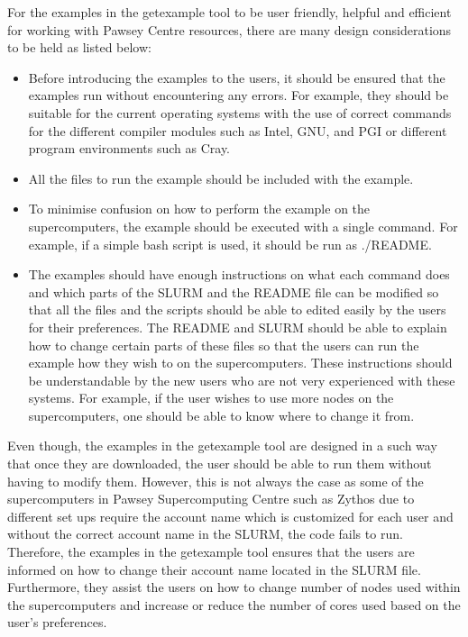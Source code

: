 For the examples in the getexample tool to be user friendly, helpful and efficient for working with Pawsey Centre resources, there are many design 
considerations to be held as listed below:

\begin{itemize}
\item Before introducing the examples to the users, it should be ensured that the examples run without encountering any errors. For example,
they should be suitable for the current operating systems with the use of correct commands for the different compiler modules such as Intel, GNU,
and PGI or different program environments such as Cray.
\item All the files to run the example should be included with the example.
\item To minimise confusion on how to perform the example on the supercomputers, the example should be executed with a single command. For example, 
if a simple bash script is used, it should be run as ./README.
\item The examples should have enough instructions on what each command does and which parts of the SLURM and the README file can be modified so that
all the files and the scripts should be able to edited easily by the users for their preferences. The README and SLURM should be able to explain how to 
change certain parts of these files so that the users can run the example how they wish to on the supercomputers. These instructions should be 
understandable by the new users who are not very experienced with these systems. For example, if the user wishes to use more nodes on the supercomputers,
one should be able to know where to change it from.
\end{itemize}
 
Even though, the examples in the getexample tool are designed in a such way that once they are downloaded, the user should be able to run them without
having to modify them. However, this is not always the case as some of the supercomputers in Pawsey Supercomputing Centre such as Zythos due to
different set ups require the account name which is customized for each user and without the correct account name in the SLURM, the code fails to run. 
Therefore, the examples in the getexample tool ensures that the users are informed on how to change their account name located in the SLURM file.
Furthermore, they assist the users on how to change number of nodes used within the supercomputers and increase or reduce the number of cores used
based on the user's preferences.

